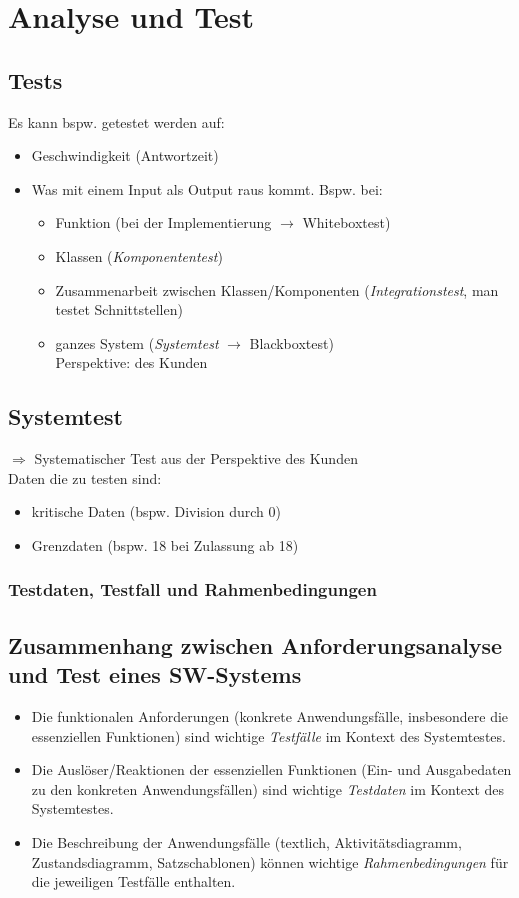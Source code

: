 \chapter{Analyse und Test}
\section{Tests}
Es kann bspw. getestet werden auf:
\begin{itemize}
\item Geschwindigkeit (Antwortzeit)
\item Was mit einem Input als Output raus kommt. Bspw. bei:
\begin{itemize}
\item Funktion (bei der Implementierung $\to$ Whiteboxtest)
\item Klassen (\emph{Komponententest})
\item Zusammenarbeit zwischen Klassen/Komponenten (\emph{Integrationstest}, man testet Schnittstellen)
\item ganzes System (\emph{Systemtest} $\to$ Blackboxtest)\\
Perspektive: des Kunden
\end{itemize}
\end{itemize}

\section{Systemtest}
$\Rightarrow$ Systematischer Test aus der Perspektive des Kunden\\
Daten die zu testen sind:
\begin{itemize}
\item kritische Daten (bspw. Division durch 0)
\item Grenzdaten (bspw. 18 bei Zulassung ab 18)
\end{itemize}

\subsection{Testdaten, Testfall und Rahmenbedingungen}

\section{Zusammenhang zwischen Anforderungsanalyse und Test eines SW-Systems}
\begin{itemize}
\item Die funktionalen Anforderungen (konkrete Anwendungsfälle, insbesondere die essenziellen Funktionen) sind wichtige \emph{Testfälle} im Kontext des Systemtestes.
\item Die Auslöser/Reaktionen der essenziellen Funktionen (Ein- und Ausgabedaten zu den konkreten Anwendungsfällen) sind wichtige \emph{Testdaten} im Kontext des Systemtestes.
\item Die Beschreibung der Anwendungsfälle (textlich, Aktivitätsdiagramm, Zustandsdiagramm, Satzschablonen) können wichtige \emph{Rahmenbedingungen} für die jeweiligen Testfälle enthalten.
\end{itemize}






